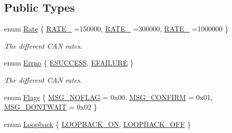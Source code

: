 \subsection*{Public Types}
\begin{DoxyCompactItemize}
\item 
enum \hyperlink{classosa_c_a_n_bus_ae977dbc0e1c16772395408c8e018fe6c}{Rate} \{ \hyperlink{classosa_c_a_n_bus_ae977dbc0e1c16772395408c8e018fe6caba07be3d817138593a2d9b20beb2fd7b}{R\+A\+T\+E\+\_} =150000, 
\hyperlink{classosa_c_a_n_bus_ae977dbc0e1c16772395408c8e018fe6cacfba6e26887df2910d93f4d2dcf70b3e}{R\+A\+T\+E\+\_} =300000, 
\hyperlink{classosa_c_a_n_bus_ae977dbc0e1c16772395408c8e018fe6ca17b91a8147de2124aca3198a0bfcb7b0}{R\+A\+T\+E\+\_} =1000000
 \}
\begin{DoxyCompactList}\small\item\em The different C\+A\+N rates. \end{DoxyCompactList}\item 
enum \hyperlink{classosa_c_a_n_bus_a6fa3e95ec4c36932d0640e40e0748fde}{Errno} \{ \hyperlink{classosa_c_a_n_bus_a6fa3e95ec4c36932d0640e40e0748fdeaef10d7d2c42027e99e8b6662a516adef}{E\+S\+U\+C\+C\+E\+S\+S}, 
\hyperlink{classosa_c_a_n_bus_a6fa3e95ec4c36932d0640e40e0748fdea2bd4b249945acf638e8d93c36b122150}{E\+F\+A\+I\+L\+U\+R\+E}
 \}
\begin{DoxyCompactList}\small\item\em The different C\+A\+N rates. \end{DoxyCompactList}\item 
enum \hyperlink{classosa_c_a_n_bus_a74fe35c6059237887431f3ccece7b21b}{Flags} \{ \hyperlink{classosa_c_a_n_bus_a74fe35c6059237887431f3ccece7b21ba30f701fa6e0dba6e274540941ccd3978}{M\+S\+G\+\_\+\+N\+O\+F\+L\+A\+G} = 0x00, 
\hyperlink{classosa_c_a_n_bus_a74fe35c6059237887431f3ccece7b21baf6e1a4ae7ca482b35052ce540ff572a9}{M\+S\+G\+\_\+\+C\+O\+N\+F\+I\+R\+M} = 0x01, 
\hyperlink{classosa_c_a_n_bus_a74fe35c6059237887431f3ccece7b21bae3b54980d3955fa497e0c19728dde774}{M\+S\+G\+\_\+\+D\+O\+N\+T\+W\+A\+I\+T} = 0x02
 \}
\item 
enum \hyperlink{classosa_c_a_n_bus_a992406c83a336e95fb4a09b0b13df786}{Loopback} \{ \hyperlink{classosa_c_a_n_bus_a992406c83a336e95fb4a09b0b13df786aea134020b1d03c7df95f141401e2cb0f}{L\+O\+O\+P\+B\+A\+C\+K\+\_\+\+O\+N}, 
\hyperlink{classosa_c_a_n_bus_a992406c83a336e95fb4a09b0b13df786ae2557509d0c1ac68029eeb6bdf6e703d}{L\+O\+O\+P\+B\+A\+C\+K\+\_\+\+O\+F\+F}
 \}
\end{DoxyCompactItemize}
